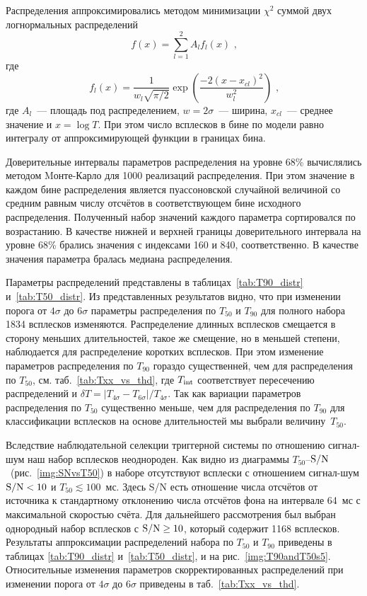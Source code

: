 Распределения  аппроксимировались методом минимизации $\chi^2$ суммой двух логнормальных распределений
\begin{equation}
f(x) = \sum_{l=1}^{2} A_l f_l(x) \mbox{ ,}
\end{equation}
где
\begin{equation}
f_l(x) = \frac{1}{w_l \sqrt{\pi/2}} \exp\left(\frac{-2(x-x_{cl})^2}{w_l^2}\right) \mbox{ ,}
\end{equation}
где $A_l$~--- площадь под распределением, $w=2\sigma$~--- ширина, $x_{cl}$~--- среднее значение и 
$x=\log T$. При этом число всплесков в бине по модели равно  интегралу от аппроксимирующей функции в границах бина. 

Доверительные интервалы параметров распределения на уровне 68\% вычислялись 
методом Mонте-Карло для 1000 реализаций распределения. При этом значение в каждом 
бине распределения является пуассоновской случайной величиной со средним равным 
числу отсчётов в соответствующем бине исходного распределения. Полученный набор 
значений каждого параметра сортировался по возрастанию. В качестве нижней и верхней 
границы доверительного интервала на уровне 68\% брались значения с индексами 160 и 840, 
соответственно. В качестве значения параметра бралась медиана распределения.

Параметры распределений представлены в таблицах~\ref{tab:T90_distr} и~\ref{tab:T50_distr}. 
Из представленных результатов видно, что при изменении порога от $4\sigma$ до $6\sigma$ 
параметры распределения по $T_{50}$ и $T_{90}$ для полного набора 1834 всплесков изменяются. 
Распределение длинных всплесков смещается в сторону меньших длительностей, такое же смещение, 
но в меньшей степени, наблюдается для распределение коротких всплесков. 
При этом изменение параметров распределения по $T_{90}$ гораздо существенней, 
чем для распределения по $T_{50}$, см. таб.~\ref{tab:Txx_vs_thd},
где $T_{{\mathrm{int}}}$ соответствует пересечению распределений и 
$\delta T =|T_{4\sigma}-T_{6\sigma}| / T_{4\sigma}$. 
Так как вариации параметров распределения по $T_{50}$ существенно меньше, 
чем для распределения по $T_{90}$ для классификации всплесков на основе длительностей 
мы выбрали величину~$T_{50}$. 



Вследствие наблюдательной селекции триггерной системы по отношению сигнал-шум 
наш набор всплесков неоднороден. Как видно из диаграммы $T_{50}$--${\mathrm{S/N}}$~(рис.~\ref{img:SNvsT50}) 
в наборе отсутствуют всплески с отношением сигнал-шум ${\mathrm{S/N}} < 10$ и $T_{50} \lesssim 100$~мс. 
Здесь S/N есть отношение числа отсчётов от источника к стандартному отклонению 
числа отсчётов фона на интервале 64~мс с максимальной скоростью счёта. 
Для дальнейшего рассмотрения был выбран однородный набор всплесков с ${\mathrm{S/N}}\geq 10$, 
который содержит 1168 всплесков. 
Результаты аппроксимации распределений набора по $T_{50}$ и $T_{90}$ приведены в 
таблицах \ref{tab:T90_distr} и~\ref{tab:T50_distr}, и на рис.~\ref{img:T90andT50s5}. 
Относительные изменения параметров скорректированных распределений при изменении 
порога от $4\sigma$ до $6\sigma$ приведены в таб.~\ref{tab:Txx_vs_thd}. 

